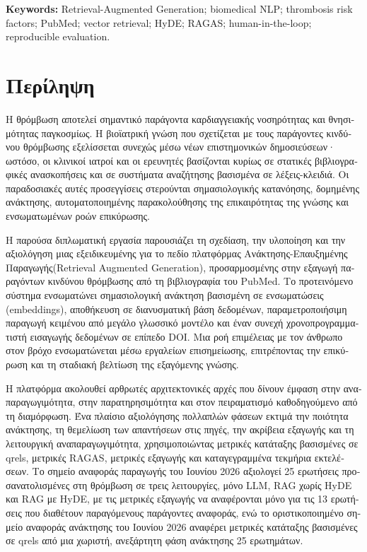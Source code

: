 \vspace{0.4cm}
\noindent \textbf{Keywords:} Retrieval-Augmented Generation; biomedical NLP; thrombosis risk factors; PubMed; vector retrieval; HyDE; RAGAS; human-in-the-loop; reproducible evaluation.

\clearpage

\chapter*{Περίληψη}
\begin{greek}

Η θρόμβωση αποτελεί σημαντικό παράγοντα καρδιαγγειακής νοσηρότητας και θνησιμότητας παγκοσμίως. Η βιοϊατρική γνώση που σχετίζεται με τους παράγοντες κινδύνου θρόμβωσης εξελίσσεται συνεχώς μέσω νέων επιστημονικών δημοσιεύσεων· ωστόσο, οι κλινικοί ιατροί και οι ερευνητές βασίζονται κυρίως σε στατικές βιβλιογραφικές ανασκοπήσεις και σε συστήματα αναζήτησης βασισμένα σε λέξεις-κλειδιά. Οι παραδοσιακές αυτές προσεγγίσεις στερούνται σημασιολογικής κατανόησης, δομημένης ανάκτησης, αυτοματοποιημένης παρακολούθησης της επικαιρότητας της γνώσης και ενσωματωμένων ροών επικύρωσης.

Η παρούσα διπλωματική εργασία παρουσιάζει τη σχεδίαση, την υλοποίηση και την αξιολόγηση μιας εξειδικευμένης για το πεδίο πλατφόρμας Ανάκτησης-Επαυξημένης Παραγωγής\linebreak(Retrieval Augmented Generation), προσαρμοσμένης στην εξαγωγή παραγόντων κινδύνου θρό\-μβωσης από τη βιβλιογραφία του PubMed. Το προτεινόμενο σύστημα ενσωματώνει σημασιολογική ανάκτηση βασισμένη σε ενσωματώσεις (embeddings), αποθήκευση σε διανυσματική βάση δεδομένων, παραμετροποιήσιμη παραγωγή κειμένου από μεγάλο γλωσσικό μοντέλο και έναν συνεχή χρονοπρογραμματιστή εισαγωγής δεδομένων σε επίπεδο DOI. Μια ροή επιμέλειας με τον άνθρωπο στον βρόχο ενσωματώνεται μέσω εργαλείων επισημείωσης, επιτρέποντας την επικύρωση και τη σταδιακή βελτίωση της εξαγόμενης γνώσης.

Η πλατφόρμα ακολουθεί αρθρωτές αρχιτεκτονικές αρχές που δίνουν έμφαση στην αναπαραγωγιμότητα, στην παρατηρησιμότητα και στον πειραματισμό καθοδηγούμενο από τη διαμόρφωση. Ένα πλαίσιο αξιολόγησης πολλαπλών φάσεων εκτιμά την ποιότητα ανάκτησης, τη θεμελίωση των απαντήσεων στις πηγές, την ακρίβεια εξαγωγής και τη λειτουργική αναπαραγωγιμότητα, χρησιμοποιώντας μετρικές κατάταξης βασισμένες σε qrels, μετρικές RAGAS, μετρικές εξαγωγής και καταγεγραμμένα τεκμήρια εκτελέσεων. Το σημείο αναφοράς παραγωγής του Ιουνίου 2026 αξιολογεί 25 ερωτήσεις προσανατολισμένες στη θρόμβωση σε τρεις λειτουργίες, μόνο LLM, RAG χωρίς HyDE και RAG με HyDE, με τις μετρικές εξαγωγής να αναφέρονται μόνο για τις 13 ερωτήσεις που διαθέτουν παραγόμενους παράγοντες αναφοράς, ενώ το οριστικοποιημένο σημείο αναφοράς ανάκτησης του Ιουνίου 2026 αναφέρει μετρικές κατάταξης βασισμένες σε qrels από μια χωριστή, ανεξάρτητη φάση ανάκτησης 25 ερωτημάτων.


\end{greek}
